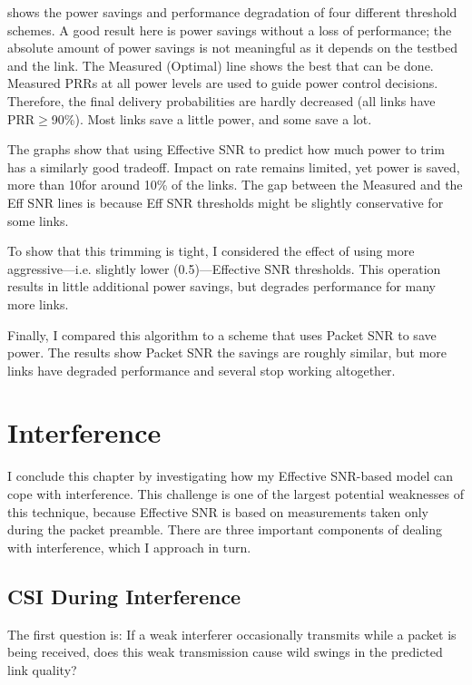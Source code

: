  shows the power savings and performance degradation of four different threshold schemes. A good result here is power savings without a loss of performance; the absolute amount of power savings is not meaningful as it depends on the testbed and the link. The Measured (Optimal) line shows the best that can be done. Measured PRRs at all power levels are used to guide power control decisions. Therefore, the final delivery probabilities are hardly decreased (all links have PRR$\geq$90\%). Most links save a little power, and some save a lot.

The graphs show that using Effective SNR to predict how much power to trim has a similarly good tradeoff. Impact on rate remains limited, yet power is saved, more than 10\dB for around 10\% of the links. The gap between the Measured and the Eff SNR lines is because Eff SNR thresholds might be slightly conservative for some links.

To show that this trimming is tight, I considered the effect of using more aggressive---i.e. slightly lower (0.5\dB)---Effective SNR thresholds. This operation results in little additional power savings, but degrades performance for many more links.

Finally, I compared this algorithm to a scheme that uses Packet SNR to save power. The results show Packet SNR the savings are roughly similar, but more links have degraded performance and several stop working altogether.


\section{Interference}
\label{sec:interference}
I conclude this chapter by investigating how my Effective SNR-based model can cope with interference. This challenge is one of the largest potential weaknesses of this technique, because Effective SNR is based on measurements taken only during the packet preamble. There are three important components of dealing with interference, which I approach in turn.

\subsection{CSI During Interference}
The first question is: If a weak interferer occasionally transmits while a packet is being received, does this weak transmission cause wild swings in the predicted link quality?

